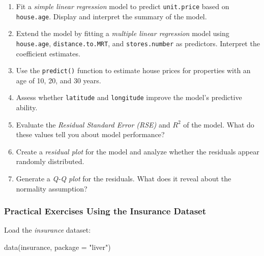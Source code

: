 \documentclass[
  11pt,
]{book}
\makeatletter
\newenvironment{Shaded}{}{}
\newcommand{\AttributeTok}[1]{#1}
\newcommand{\FunctionTok}[1]{#1}
\newcommand{\NormalTok}[1]{#1}
\newcommand{\StringTok}[1]{\textcolor[rgb]{0.39,0.39,0.39}{#1}}
\providecommand{\tightlist}{%
  \setlength{\itemsep}{0pt}\setlength{\parskip}{0pt}}
\newenvironment{kframe}{%
\medskip{}
\setlength{\fboxsep}{.8em}
 \def\at@end@of@kframe{}%
 \ifinner\ifhmode%
  \def\at@end@of@kframe{\end{minipage}}%
  \begin{minipage}{\columnwidth}%
 \fi\fi%
 \def\FrameCommand##1{\hskip\@totalleftmargin \hskip-\fboxsep
 \colorbox{shadecolor}{##1}\hskip-\fboxsep
     \hskip-\linewidth \hskip-\@totalleftmargin \hskip\columnwidth}%
 \MakeFramed {\advance\hsize-\width
   \@totalleftmargin\z@ \linewidth\hsize
   \@setminipage}}%
 {\par\unskip\endMakeFramed%
 \at@end@of@kframe}
\renewenvironment{Shaded}{\begin{kframe}}{\end{kframe}}
\theoremstyle{definition}
\theoremstyle{definition}
\theoremstyle{definition}
\theoremstyle{definition}
\theoremstyle{remark}
\makeatother
\begin{document}
\begin{enumerate}
\def\labelenumi{\arabic{enumi}.}
\setcounter{enumi}{7}
\tightlist
\item
  Fit a \emph{simple linear regression} model to predict \texttt{unit.price} based on \texttt{house.age}. Display and interpret the summary of the model.\\
\item
  Extend the model by fitting a \emph{multiple linear regression} model using \texttt{house.age}, \texttt{distance.to.MRT}, and \texttt{stores.number} as predictors. Interpret the coefficient estimates.\\
\item
  Use the \texttt{predict()} function to estimate house prices for properties with an age of 10, 20, and 30 years.\\
\item
  Assess whether \texttt{latitude} and \texttt{longitude} improve the model's predictive ability.\\
\item
  Evaluate the \emph{Residual Standard Error (RSE)} and \emph{\(R^2\)} of the model. What do these values tell you about model performance?\\
\item
  Create a \emph{residual plot} for the model and analyze whether the residuals appear randomly distributed.\\
\item
  Generate a \emph{Q-Q plot} for the residuals. What does it reveal about the normality assumption?
\end{enumerate}

\subsubsection*{Practical Exercises Using the Insurance Dataset}\label{practical-exercises-using-the-insurance-dataset}


Load the \emph{insurance} dataset:

\begin{Shaded}
\begin{Highlighting}[]
\FunctionTok{data}\NormalTok{(insurance, }\AttributeTok{package =} \StringTok{"liver"}\NormalTok{)}
\end{Highlighting}
\end{Shaded}
\end{document}
